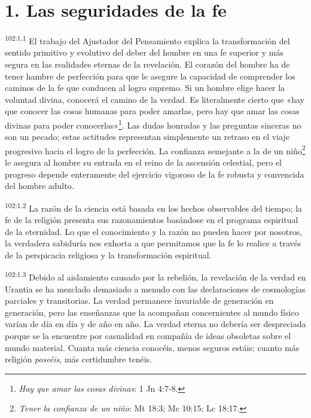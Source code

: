 \section*{1. Las seguridades de la fe}
\par
\textsuperscript{102:1.1} El trabajo del Ajustador del Pensamiento explica la transformación del sentido primitivo y evolutivo del deber del hombre en una fe superior y más segura en las realidades eternas de la revelación. El corazón del hombre ha de tener hambre de perfección para que le asegure la capacidad de comprender los caminos de la fe que conducen al logro supremo. Si un hombre elige hacer la voluntad divina, conocerá el camino de la verdad. Es literalmente cierto que «hay que conocer las cosas humanas para poder amarlas, pero hay que amar las cosas divinas para poder conocerlas»\footnote{\textit{Hay que amar las cosas divinas}: 1 Jn 4:7-8.}. Las dudas honradas y las preguntas sinceras no son un pecado; estas actitudes representan simplemente un retraso en el viaje progresivo hacia el logro de la perfección. La confianza semejante a la de un niño\footnote{\textit{Tener la confianza de un niño}: Mt 18:3; Mc 10:15; Lc 18:17.} le asegura al hombre su entrada en el reino de la ascensión celestial, pero el progreso depende enteramente del ejercicio vigoroso de la fe robusta y convencida del hombre adulto.

\par
\textsuperscript{102:1.2} La razón de la ciencia está basada en los hechos observables del tiempo; la fe de la religión presenta sus razonamientos basándose en el programa espiritual de la eternidad. Lo que el conocimiento y la razón no pueden hacer por nosotros, la verdadera sabiduría nos exhorta a que permitamos que la fe lo realice a través de la perspicacia religiosa y la transformación espiritual.

\par
\textsuperscript{102:1.3} Debido al aislamiento causado por la rebelión, la revelación de la verdad en Urantia se ha mezclado demasiado a menudo con las declaraciones de cosmologías parciales y transitorias. La verdad permanece invariable de generación en generación, pero las enseñanzas que la acompañan concernientes al mundo físico varían de día en día y de año en año. La verdad eterna no debería ser despreciada porque se la encuentre por casualidad en compañía de ideas obsoletas sobre el mundo material. Cuanta más ciencia conocéis, menos seguros estáis; cuanto más religión \textit{poseéis}, más certidumbre tenéis.

